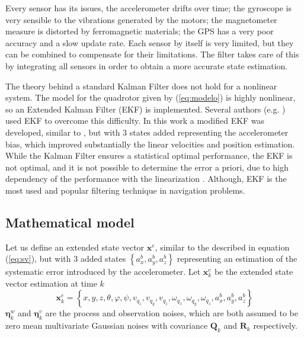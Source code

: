 \documentclass[conference]{IEEEtran}
\newcommand{\refp}[1]{(\ref{#1})}
\begin{document}
Every sensor has its issues, the accelerometer drifts over time; the gyroscope is very sensible to the vibrations generated by the motors; the magnetometer measure is distorted by ferromagnetic materials; the GPS has a very poor accuracy and a slow update rate. Each sensor by itself is very limited, but they can be combined to compensate for their limitations. The filter takes care of this by integrating all sensors in order to obtain a more accurate state estimation. 

The theory behind a standard Kalman Filter does not hold for a nonlinear system. The model for the quadrotor given by \refp{eq:modelo} is highly nonlinear, so an Extended Kalman Filter (EKF) is implemented. Several authors (e.g. \cite{bib:kalman,bib:kalman2}) used EKF to overcome this difficulty. In this work a modified EKF was developed, similar to \cite{bib:kalman,bib:kalman2}, but with 3 states added representing the accelerometer bias, which improved substantially the linear velocities and position estimation. While the Kalman Filter ensures a statistical optimal performance, the EKF is not optimal, and it is not possible to determine the error a priori, due to high dependency of the performance with the linearization \cite{bib:kay}. Although, EKF is the most used and popular filtering technique in navigation problems. 

\subsection{Mathematical model}

Let us define an extended state vector $\mathbf{x}^e$, similar to the described in equation \refp{eq:sv}, but with 3 added states $\left\lbrace a_x^b,a_y^b,a_z^b\right\rbrace$ representing an estimation of the systematic error introduced by the accelerometer. Let $\mathbf{x}_k^e$ be the extended state vector estimation at time $k$
$$
\mathbf{x}^e_k = \left\lbrace  x,y,z, \theta,\varphi,\psi, v_{q_z},v_{q_y},v_{q_z},\omega_{q_x},\omega_{q_y},\omega_{q_z}, a_x^b,a_y^b,a_z^b \right\rbrace
$$
$\boldsymbol{\eta}^{w}_{k}$ and $\boldsymbol{\eta}^{v}_{k}$ are the process and observation noises, which are both assumed to be zero mean multivariate Gaussian noises with covariance $\mathbf{Q}_k$ and $\mathbf{R}_k$ respectively. \\
\end{document}
